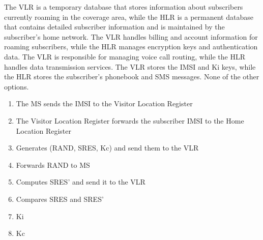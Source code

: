 \begin{checkboxes}
    \CorrectChoice The VLR is a temporary database that stores information about subscribers currently roaming in the coverage area, while the HLR is a permanent database that contains detailed subscriber information and is maintained by the subscriber's home network.
    \choice The VLR handles billing and account information for roaming subscribers, while the HLR manages encryption keys and authentication data.
    \choice The VLR is responsible for managing voice call routing, while the HLR handles data transmission services.
    \choice The VLR stores the IMSI and Ki keys, while the HLR stores the subscriber's phonebook and SMS messages.
    \choice None of the other options.
\end{checkboxes}


\begin{solution}
    \begin{enumerate}
        \item The MS sends the IMSI to the Visitor Location Register
        \item The Visitor Location Register forwards the subscriber IMSI to the Home Location Register
        \item Generates (RAND, SRES, Kc) and send them to the VLR
        \item Forwards RAND to MS
        \item Computes SRES' and send it to the VLR
        \item Compares SRES and SRES'
        \item Ki
        \item Kc
    \end{enumerate}
\end{solution}

